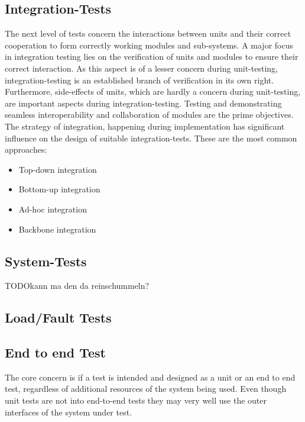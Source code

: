 \documentclass[master,english,smartquotes,apa]{hgbthesis}
\begin{document}
			\subsection{Integration-Tests}
			The next level of tests concern the interactions between units and their correct cooperation to form correctly working modules and sub-systems. A major focus in integration testing lies on the verification of units and modules to ensure their correct interaction. As this aspect is of a lesser concern during unit-testing, integration-testing is an established branch of verification in its own right. Furthermore, side-effects of units, which are hardly a concern during unit-testing, are important aspects during integration-testing. Testing and demonstrating seamless interoperability and collaboration of modules are the prime objectives. \cite{SpilSoft2005} %
			The strategy of integration, happening during implementation has significant influence on the design of suitable integration-tests. These are the most common approaches:
			\begin{itemize} \setlength\itemsep{1px}
			\item Top-down integration 
			\item Bottom-up integration 
			\item Ad-hoc integration 
			\item Backbone integration 
			\end{itemize} 
			
			\subsection{System-Tests}
			TODO{kann ma den da reinschummeln?}
			\cite{Beizer95}
			\subsection{Load/Fault Tests}
			
			\subsection{End to end Test}
			The core concern is if a test is intended and designed as a unit or an end to end test, regardless of additional resources of the system being used.
			Even though unit tests are not into end-to-end tests they may very well use the outer interfaces of the system under test.
\end{document}
